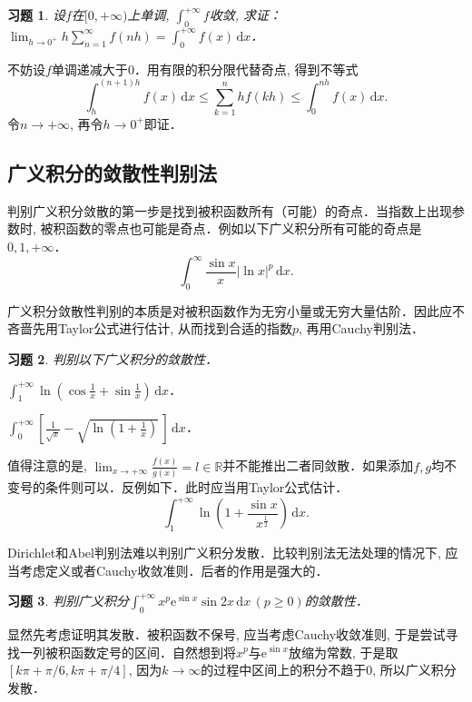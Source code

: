 \documentclass[11pt,a4paper]{ctexart}
\makeatletter
\theoremstyle{thmseries} %
\theoremstyle{exerseries}
\newtheorem{exer}{习题}[section]
\renewenvironment{proof}[1][\proofname]{\par
  \pushQED{\qed}%
  \normalfont \topsep6\p@\@plus6\p@\relax
  \trivlist
  \item[\hskip\labelsep
        \itshape
    #1\@addpunct{}]\ignorespaces
}{%
  \popQED\endtrivlist\@endpefalse
}
\newenvironment{sol}{\begin{proof}[\bfseries\upshape 解\quad]}{\end{proof}}
\newenvironment{pf}{\begin{proof}[\bfseries\upshape 证\quad]}{\end{proof}}
\newcommand{\bra}[1]{\mathopen{}\left(#1\right)}
\newcommand{\sbra}[1]{\mathopen{}\left[#1\right]}
\newcommand{\R}{\mathbb{R}}
\renewcommand{\d}{\mathrm{d}}
\newcommand{\e}{\mathrm{e}}
\makeatother
\begin{document}
\begin{exer}
	设$f$在$[0,+\infty)$上单调, $\int_{0}^{+\infty}f$收敛, 求证：$\lim_{h\to0^+}h\sum_{n=1}^{\infty}f(nh)=\int_{0}^{+\infty}f(x)\,\d x$．
\end{exer}
\begin{pf}
	不妨设$f$单调递减大于$0$．用有限的积分限代替奇点, 得到不等式
	\[\int_{h}^{(n+1)h}f(x)\,\d x\leq\sum_{k=1}^{n}hf(kh)\leq\int_{0}^{nh}f(x)\,\d x.\]
	令$n\to+\infty$, 再令$h\to0^+$即证．
\end{pf}


\subsection{广义积分的敛散性判别法}
判别广义积分敛散的第一步是找到被积函数所有（可能）的奇点．当指数上出现参数时, 被积函数的零点也可能是奇点．例如以下广义积分所有可能的奇点是$0,1,+\infty$．
\[\int_{0}^{\infty}\frac{\sin x}{x}|\ln x|^p\,\d x.\]

广义积分敛散性判别的本质是对被积函数作为无穷小量或无穷大量估阶．因此应不吝啬先用Taylor公式进行估计, 从而找到合适的指数$p$, 再用Cauchy判别法．
\begin{exer}
	判别以下广义积分的敛散性．
	\begin{enumerate}
	\end{enumerate}
\end{exer}

值得注意的是, $\lim_{x\to+\infty}\frac{f(x)}{g(x)}=l\in\R$并不能推出二者同敛散．如果添加$f,g$均不变号的条件则可以．反例如下．此时应当用Taylor公式估计．
\[\int_{1}^{+\infty}\ln\bra{1+\frac{\sin x}{x^\frac{1}{2}}}\,\d x.\]

Dirichlet和Abel判别法难以判别广义积分发散．比较判别法无法处理的情况下, 应当考虑定义或者Cauchy收敛准则．后者的作用是强大的．
\begin{exer}
	判别广义积分$\int_{0}^{+\infty}x^p\e^{\sin x}\sin 2x\,\d x\,(p\geq0)$的敛散性．
\end{exer}
\begin{sol}
	显然先考虑证明其发散．被积函数不保号, 应当考虑Cauchy收敛准则, 于是尝试寻找一列被积函数定号的区间．自然想到将$x^p$与$\e^{\sin x}$放缩为常数, 于是取$[k\pi+\pi/6,k\pi+\pi/4]$, 因为$k\to\infty$的过程中区间上的积分不趋于$0$, 所以广义积分发散．
\end{sol}
\end{document}
